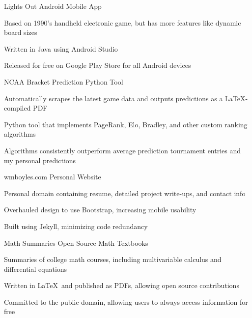 \documentclass[a4paper]{awesome-cv}
\begin{document}
	\begin{cventries}
		\cvprojectentry
		{Lights Out} %
		{Android Mobile App} %
		{
			\begin{cvitems} %
				\item {Based on 1990’s handheld electronic game, but has more features like dynamic board sizes}
				\item {Written in Java using Android Studio}
				\item {Released for free on Google Play Store for all Android devices}
			\end{cvitems}
		}
	
		\cvprojectentry
		{NCAA Bracket Prediction} %
		{Python Tool} %
		{
			\begin{cvitems} %
				\item {Automatically scrapes the latest game data and outputs predictions as a \LaTeX-compiled PDF}
				\item {Python tool that implements PageRank, Elo, Bradley, and other custom ranking algorithms}
				\item {Algorithms consistently outperform average prediction tournament entries and my personal predictions}
			\end{cvitems}
		}
	
		\cvprojectentry
		{wmboyles.com} %
		{Personal Website} %
		{
			\begin{cvitems} %
				\item {Personal domain containing resume, detailed project write-ups, and contact info}
				\item {Overhauled design to use Bootstrap, increasing mobile usability}
				\item {Built using Jekyll, minimizing code redundancy}
			\end{cvitems}
		}
	
		\cvprojectentry
		{Math Summaries} %
		{Open Source Math Textbooks} %
		{
			\begin{cvitems} %
				\item {Summaries of college math courses, including multivariable calculus and differential equations}
				\item {Written in \LaTeX ~and published as PDFs, allowing open source contributions}
				\item {Committed to the public domain, allowing users to always access information for free}
			\end{cvitems}
		}
	\end{cventries}
\end{document}
